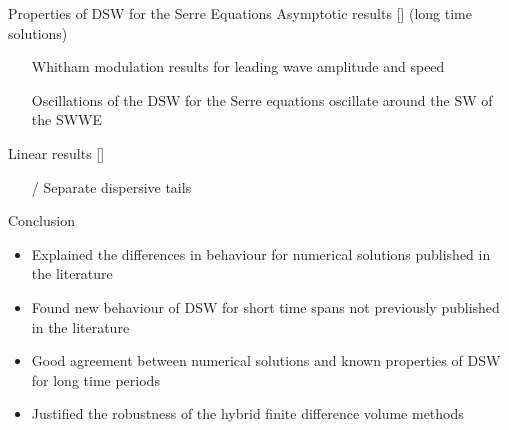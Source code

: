 \documentclass[pdf]{beamer}
\newcommand{\xmark}{\ding{55}}%
\begin{document}
\begin{frame}{Properties of DSW for the Serre Equations}
	Asymptotic results [] (long time solutions)
	\begin{itemize}
		\item[{\color{green!60!black}\checkmark}] Whitham modulation results for leading wave amplitude and speed 
		\item[{\color{green!60!black}\checkmark}] Oscillations of the DSW for the Serre equations oscillate around the SW of the SWWE \newline 
	\end{itemize}
	Linear results []
	\begin{itemize}
		\item[{\color{red} \xmark}{ \color{black} /}{ \color{green!60!black}\checkmark}]  Separate dispersive tails
	\end{itemize}
\end{frame}

\begin{frame}{Conclusion}
	\begin{itemize}
		\item Explained the differences in behaviour for numerical solutions published in the literature
		\item Found new behaviour of DSW for short time spans not previously published in the literature
		\item Good agreement between numerical solutions and known properties of DSW for long time periods
		\item Justified the robustness of the hybrid finite difference volume methods
	\end{itemize}
\end{frame}
\end{document}
